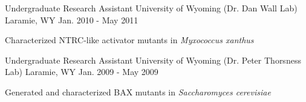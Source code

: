 \begin{cventries}
  \cventry
    {Undergraduate Research Assistant} %
    {University of Wyoming (Dr. Dan Wall Lab)} %
    {Laramie, WY} %
    {Jan. 2010 - May 2011} %
    {
      \begin{cvitems} %
        \item {Characterized NTRC-like activator mutants in \textit{Myxococcus xanthus}}
      \end{cvitems}
    }

  \cventry
    {Undergraduate Research Assistant} %
    {University of Wyoming (Dr. Peter Thorsness Lab)} %
    {Laramie, WY} %
    {Jan. 2009 - May 2009} %
    {
      \begin{cvitems} %
        \item {Generated and characterized BAX mutants in \textit{Saccharomyces cerevisiae}}
      \end{cvitems}
    }

\end{cventries}
